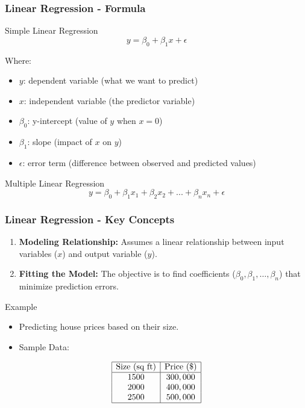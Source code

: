 \documentclass{beamer}
\begin{document}
\begin{frame}[fragile]
    \frametitle{Linear Regression - Formula}
    \begin{block}{Simple Linear Regression}
        \begin{equation}
            y = \beta_0 + \beta_1 x + \epsilon 
        \end{equation}
    \end{block}
    
    Where:
    \begin{itemize}
        \item \( y \): dependent variable (what we want to predict)
        \item \( x \): independent variable (the predictor variable)
        \item \( \beta_0 \): y-intercept (value of \( y \) when \( x = 0 \))
        \item \( \beta_1 \): slope (impact of \( x \) on \( y \))
        \item \( \epsilon \): error term (difference between observed and predicted values)
    \end{itemize}

    \begin{block}{Multiple Linear Regression}
        \begin{equation}
            y = \beta_0 + \beta_1 x_1 + \beta_2 x_2 + ... + \beta_n x_n + \epsilon 
        \end{equation}
    \end{block}
\end{frame}

\begin{frame}[fragile]
    \frametitle{Linear Regression - Key Concepts}
    \begin{enumerate}
        \item \textbf{Modeling Relationship:} Assumes a linear relationship between input variables (\( x \)) and output variable (\( y \)).
        \item \textbf{Fitting the Model:} The objective is to find coefficients (\( \beta_0, \beta_1, \ldots, \beta_n \)) that minimize prediction errors.
    \end{enumerate}
    
    \begin{block}{Example}
        \begin{itemize}
            \item Predicting house prices based on their size.
            \item Sample Data:
            \end{itemize}
            \[
            \begin{array}{|c|c|}
            \hline
            \text{Size (sq ft)} & \text{Price (\$)} \\
            \hline
            1500 & 300,000 \\
            2000 & 400,000 \\
            2500 & 500,000 \\
            \hline
            \end{array}
            \]
        \end{block}
\end{frame}
\end{document}
